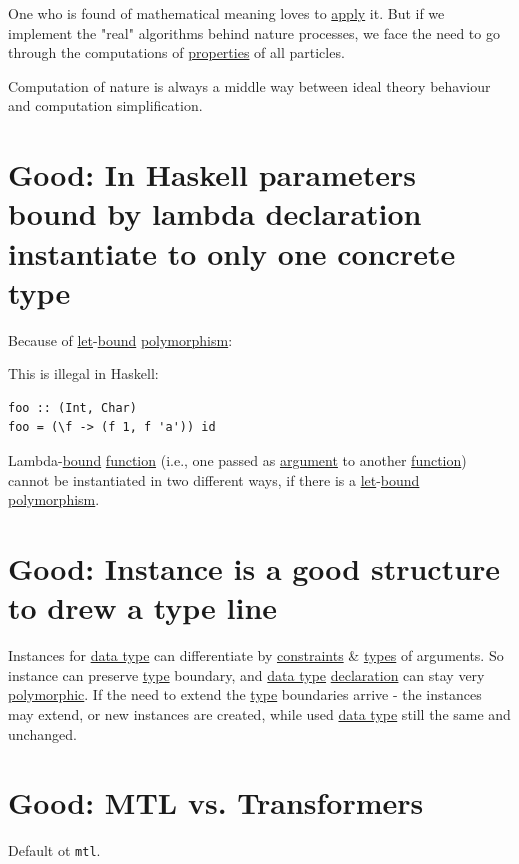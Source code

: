 \documentclass[a4paper,14pt,oneside]{book}
\begin{document}
One who is found of mathematical meaning loves to \hyperref[org7b7b42e]{apply} it. But if we implement the "real" algorithms behind nature processes, we face the need to go through the computations of \hyperref[org7fe96da]{properties} of all particles.

Computation of nature is always a middle way between ideal theory behaviour and computation simplification.

\chapter{\label{org93388ae}Good: In Haskell parameters bound by lambda declaration instantiate to only one concrete type}
\label{sec:orgff69e8e}
Because of \hyperref[orgceb59d9]{let}-\hyperref[org66383c8]{bound} \hyperref[orgb90669b]{polymorphism}:

This is illegal in Haskell:
\begin{verbatim}
foo :: (Int, Char)
foo = (\f -> (f 1, f 'a')) id
\end{verbatim}

Lambda-\hyperref[org66383c8]{bound} \hyperref[org0587972]{function} (i.e., one passed as \hyperref[orgd480d85]{argument} to another \hyperref[org0587972]{function}) cannot be instantiated in two different ways, if there is a \hyperref[orgceb59d9]{let}-\hyperref[org66383c8]{bound} \hyperref[orgb90669b]{polymorphism}.


\chapter{\label{orgda1b94e}Good: Instance is a good structure to drew a type line}
\label{sec:org284bef9}

Instances for \hyperref[org76f6ae1]{data type} can differentiate by \hyperref[org733842a]{constraints} \& \hyperref[orgafd8fcb]{types} of arguments. So instance can preserve \hyperref[orga7d212f]{type} boundary, and \hyperref[org76f6ae1]{data type} \hyperref[org0ee3e49]{declaration} can stay very \hyperref[orgf7426a0]{polymorphic}. If the need to extend the \hyperref[orga7d212f]{type} boundaries arrive - the instances may extend, or new instances are created, while used \hyperref[org76f6ae1]{data type} still the same and unchanged.

\chapter{\label{orgd822e72}Good: MTL vs. Transformers}
\label{sec:org98a93e9}
Default ot \texttt{mtl}.
\end{document}

